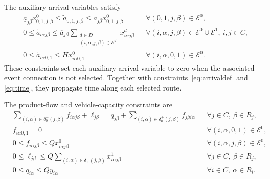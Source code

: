 \documentclass[10pt]{article}
\begin{document}
The auxiliary arrival variables satisfy
\begin{align}
&\underline a_{j\beta}x^0_{0,1,j,\beta}
\le
\widetilde a_{0,1,j,\beta}
\le
\overline a_{j\beta}x^0_{0,1,j,\beta}
&&\forall (0,1,j,\beta)\in\mathcal E^0,
\label{eq:depotaux}\\
&0
\le
\widetilde a_{i\alpha j\beta}
\le
\overline a_{j\beta}
\sum_{\substack{d\in D\\
(i,\alpha,j,\beta)\in\mathcal E^d}}
x^d_{i\alpha j\beta}
&&\forall
(i,\alpha,j,\beta)\in\mathcal E^0\cup\mathcal E^1,\
i,j\in C,
\label{eq:customeraux}\\
&0
\le
\widetilde a_{i\alpha 0,1}
\le
Hx^0_{i\alpha 0,1}
&&\forall (i,\alpha,0,1)\in\mathcal E^0.
\label{eq:returnaux}
\end{align}
These constraints set each auxiliary arrival variable to zero when the associated event connection is not selected. Together with constraints~\eqref{eq:arrivaldef} and \eqref{eq:time}, they propagate time along each selected route.

The product-flow and vehicle-capacity constraints are
\begin{align}
&\sum_{(i,\alpha)\in\delta_0^-(j,\beta)}
f_{i\alpha j\beta}
+
\ell_{j\beta}
=
q_{j\beta}
+
\sum_{(i,\alpha)\in\delta_0^+(j,\beta)}
f_{j\beta i\alpha}
&&\forall j\in C,\ \beta\in R_j,
\label{eq:product}\\
&f_{i\alpha 0,1}=0
&&\forall (i,\alpha,0,1)\in\mathcal E^0,
\label{eq:returnempty}\\
&0\le f_{i\alpha j\beta}
\le Qx^0_{i\alpha j\beta}
&&\forall (i,\alpha,j,\beta)\in\mathcal E^0,
\label{eq:directcapacity}\\
&0\le\ell_{j\beta}
\le
Q
\sum_{(i,\alpha)\in\delta_1^-(j,\beta)}
x^1_{i\alpha j\beta}
&&\forall j\in C,\ \beta\in R_j,
\label{eq:reloadcapacity}\\
&0\le q_{i\alpha}\le Qy_{i\alpha}
&&\forall i\in C,\ \alpha\in R_i.
\label{eq:delivery}
\end{align}
\end{document}
